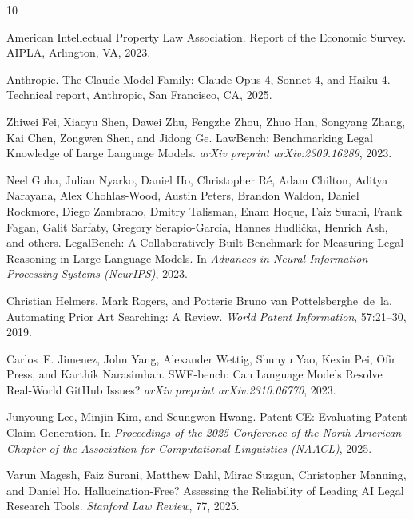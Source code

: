 \documentclass[11pt]{article}
\begin{document}
\begin{thebibliography}{10}

American Intellectual Property Law Association.
 Report of the Economic Survey.
\newblock AIPLA, Arlington, VA, 2023.

Anthropic.
\newblock The Claude Model Family: Claude Opus 4, Sonnet 4, and Haiku 4.
\newblock Technical report, Anthropic, San Francisco, CA, 2025.

Zhiwei Fei, Xiaoyu Shen, Dawei Zhu, Fengzhe Zhou, Zhuo Han, Songyang Zhang, Kai Chen, Zongwen Shen, and Jidong Ge.
\newblock LawBench: Benchmarking Legal Knowledge of Large Language Models.
\newblock \emph{arXiv preprint arXiv:2309.16289}, 2023.

Neel Guha, Julian Nyarko, Daniel Ho, Christopher R\'{e}, Adam Chilton, Aditya Narayana, Alex Chohlas-Wood, Austin Peters, Brandon Waldon, Daniel Rockmore, Diego Zambrano, Dmitry Talisman, Enam Hoque, Faiz Surani, Frank Fagan, Galit Sarfaty, Gregory Serapio-Garc\'{i}a, Hannes Hudli\v{c}ka, Henrich Ash, and others.
\newblock LegalBench: A Collaboratively Built Benchmark for Measuring Legal Reasoning in Large Language Models.
\newblock In \emph{Advances in Neural Information Processing Systems (NeurIPS)}, 2023.

Christian Helmers, Mark Rogers, and Potterie Bruno van Pottelsberghe~de~la.
\newblock Automating Prior Art Searching: A Review.
\newblock \emph{World Patent Information}, 57:21--30, 2019.

Carlos~E. Jimenez, John Yang, Alexander Wettig, Shunyu Yao, Kexin Pei, Ofir Press, and Karthik Narasimhan.
\newblock SWE-bench: Can Language Models Resolve Real-World GitHub Issues?
\newblock \emph{arXiv preprint arXiv:2310.06770}, 2023.

Junyoung Lee, Minjin Kim, and Seungwon Hwang.
\newblock Patent-CE: Evaluating Patent Claim Generation.
\newblock In \emph{Proceedings of the 2025 Conference of the North American Chapter of the Association for Computational Linguistics (NAACL)}, 2025.

Varun Magesh, Faiz Surani, Matthew Dahl, Mirac Suzgun, Christopher Manning, and Daniel Ho.
\newblock Hallucination-Free? Assessing the Reliability of Leading AI Legal Research Tools.
\newblock \emph{Stanford Law Review}, 77, 2025.


\end{thebibliography}
\end{document}
